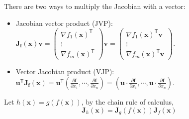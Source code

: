 \documentclass[11pt]{article}
\begin{document}
There are two ways to multiply the Jacobian with a vector:
\begin{itemize}
    \item Jacobian vector product (JVP): $\mathbf{J}_{\boldsymbol{f}}(\boldsymbol{x}) \boldsymbol{v} = \begin{pmatrix} \nabla f_1(\boldsymbol{x})^\mathsf{T} \\ \vdots \\ \nabla f_m(\boldsymbol{x})^\mathsf{T} \end{pmatrix} \boldsymbol{v} = \begin{pmatrix} \nabla f_1(\boldsymbol{x})^\mathsf{T} \boldsymbol{v} \\ \vdots \\ \nabla f_m(\boldsymbol{x})^\mathsf{T} \boldsymbol{v} \end{pmatrix}$.
    \item Vector Jacobian product (VJP): $\boldsymbol{u}^\mathsf{T} \mathbf{J}_{\boldsymbol{f}}(\boldsymbol{x}) = \boldsymbol{u}^\mathsf{T} \left( \frac{\partial \boldsymbol{f}}{\partial x_1}, \cdots, \frac{\partial \boldsymbol{f}}{\partial x_n} \right) = \left( \boldsymbol{u} \cdot \frac{\partial \boldsymbol{f}}{\partial x_1}, \cdots, \boldsymbol{u} \cdot \frac{\partial \boldsymbol{f}}{\partial x_n} \right)$.
\end{itemize}

Let $h(\boldsymbol{x}) = g(f(\boldsymbol{x}))$, by the chain rule of calculus,
\[
\mathbf{J}_h(\boldsymbol{x}) = \mathbf{J}_g(f(\boldsymbol{x})) \mathbf{J}_f(\boldsymbol{x})
\]
\end{document}
